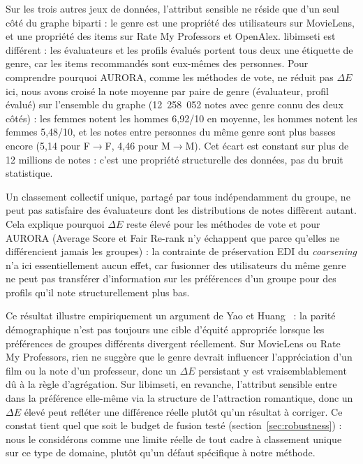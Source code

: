 \documentclass[12pt]{report}
\begin{document}
Sur les trois autres jeux de données, l'attribut sensible ne réside que
d'un seul côté du graphe biparti : le genre est une propriété des
utilisateurs sur MovieLens, et une propriété des items sur Rate My
Professors et OpenAlex. libimseti est différent : les évaluateurs et les
profils évalués portent tous deux une étiquette de genre, car les items
recommandés sont eux-mêmes des personnes. Pour comprendre pourquoi
AURORA, comme les méthodes de vote, ne réduit pas $\Delta E$ ici, nous avons
croisé la note moyenne par paire de genre (évaluateur, profil évalué) sur
l'ensemble du graphe (12~258~052 notes avec genre connu des deux côtés) :
les femmes notent les hommes 6,92/10 en moyenne, les hommes notent les
femmes 5,48/10, et les notes entre personnes du même genre sont plus
basses encore (5,14 pour F$\to$F, 4,46 pour M$\to$M). Cet écart est
constant sur plus de 12 millions de notes : c'est une propriété
structurelle des données, pas du bruit statistique.

Un classement collectif unique, partagé par tous indépendamment du
groupe, ne peut pas satisfaire des évaluateurs dont les distributions de
notes diffèrent autant. Cela explique pourquoi $\Delta E$ reste élevé
pour les méthodes de vote et pour AURORA (Average Score et Fair Re-rank
n'y échappent que parce qu'elles ne différencient jamais les groupes) :
la contrainte de préservation EDI du \emph{coarsening} n'a ici
essentiellement aucun effet, car fusionner des utilisateurs du même
genre ne peut pas transférer d'information sur les préférences d'un
groupe pour des profils qu'il note structurellement plus bas.

Ce résultat illustre empiriquement un argument de Yao et
Huang~\cite{yao_new_2017} : la parité démographique n'est pas toujours
une cible d'équité appropriée lorsque les préférences de groupes
différents divergent réellement. Sur MovieLens ou Rate My Professors,
rien ne suggère que le genre devrait influencer l'appréciation d'un film
ou la note d'un professeur, donc un $\Delta E$ persistant y est
vraisemblablement dû à la règle d'agrégation. Sur libimseti, en
revanche, l'attribut sensible entre dans la préférence elle-même via la
structure de l'attraction romantique, donc un $\Delta E$ élevé peut
refléter une différence réelle plutôt qu'un résultat à corriger. Ce
constat tient quel que soit le budget de fusion testé
(section~\ref{sec:robustness}) : nous le considérons comme une limite
réelle de tout cadre à classement unique sur ce type de domaine, plutôt
qu'un défaut spécifique à notre méthode.
\end{document}
